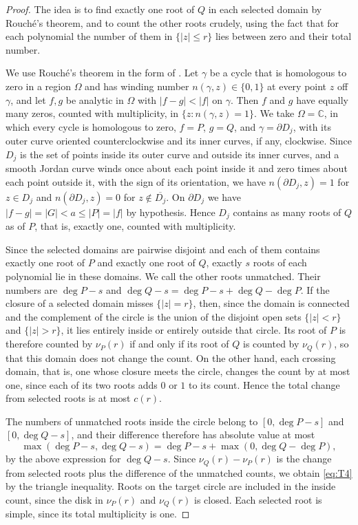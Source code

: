 \begin{proof}
The idea is to find exactly one root of $Q$ in each selected domain by
Rouch\'e's theorem, and to count the other roots crudely, using the fact
that for each polynomial the number of them in $\{|z|\le r\}$ lies between
zero and their total number.

We use Rouch\'e's theorem in the form of
\cite[Chapter~4, Section~5.2, p.~153]{Ahlfors1979}. Let $\gamma$ be a
cycle that is homologous to zero in a region $\Omega$ and has winding
number $n(\gamma,z)\in\{0,1\}$ at every point $z$ off $\gamma$, and let
$f,g$ be analytic in $\Omega$ with $|f-g|<|f|$ on $\gamma$. Then $f$ and
$g$ have equally many zeros, counted with multiplicity, in
$\{z:n(\gamma,z)=1\}$.
We take $\Omega=\mathbb C$, in which every cycle is homologous to zero,
$f=P$, $g=Q$, and $\gamma=\partial D_j$, with its outer curve oriented
counterclockwise and its inner curves, if any, clockwise.
Since $D_j$ is the set of points inside its outer curve and outside its
inner curves, and a smooth Jordan curve winds once about each point
inside it and zero times about each point outside it, with the sign of its
orientation, we have $n(\partial D_j,z)=1$ for $z\in D_j$ and
$n(\partial D_j,z)=0$ for $z\notin\overline{D_j}$.
On $\partial D_j$ we have $|f-g|=|G|<a\le|P|=|f|$ by hypothesis.
Hence $D_j$ contains as many roots of $Q$ as of $P$, that is, exactly one,
counted with multiplicity.

Since the selected domains are pairwise disjoint and each of them contains
exactly one root of $P$ and exactly one root of $Q$, exactly $s$ roots of
each polynomial lie in these domains. We call the other roots unmatched.
Their numbers are $\deg P-s$ and $\deg Q-s=\deg P-s+\deg Q-\deg P$.
If the closure of a selected domain misses $\{|z|=r\}$, then, since the
domain is connected and the complement of the circle is the union of the
disjoint open sets $\{|z|<r\}$ and $\{|z|>r\}$, it lies entirely inside or
entirely outside that circle. Its root of $P$ is therefore counted by
$\nu_P(r)$ if and only if its root of $Q$ is counted by $\nu_Q(r)$, so
that this domain does not change the count.
On the other hand, each crossing domain, that is, one whose closure meets
the circle, changes the count by at most one, since each of its two roots
adds $0$ or $1$ to its count.
Hence the total change from selected roots is at most $c(r)$.

The numbers of unmatched roots inside the circle belong to
$[0,\deg P-s]$ and $[0,\deg Q-s]$, and their difference therefore has
absolute value at most
\[
 \max(\deg P-s,\deg Q-s)=\deg P-s+\max(0,\deg Q-\deg P),
\]
by the above expression for $\deg Q-s$.
Since $\nu_Q(r)-\nu_P(r)$ is the change from selected roots plus the
difference of the unmatched counts, we obtain \eqref{eq:T4} by the triangle
inequality.
Roots on the target circle are included in the inside count,
since the disk in $\nu_P(r)$ and $\nu_Q(r)$ is closed. Each selected root is
simple, since its total multiplicity is one.
\end{proof}

